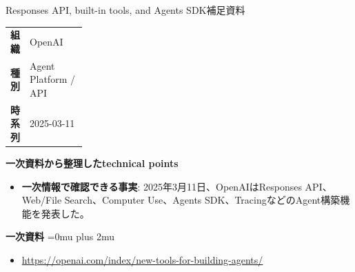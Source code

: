 \begin{technicalnote}{Responses API, built-in tools, and Agents SDK}{補足資料}
\begingroup
\begin{tabularx}{\linewidth}{@{}>{\bfseries}p{0.22\linewidth}X@{}}
組織 & OpenAI \\
種別 & Agent Platform / API \\
時系列 & 2025-03-11 \\
\end{tabularx}
\smallskip
\begin{minipage}{\linewidth}
{\bfseries 一次資料から整理したtechnical points}
\begin{itemize}[leftmargin=1.5em,itemsep=0.35em]
\item \textbf{一次情報で確認できる事実}: 2025年3月11日、OpenAIはResponses API、Web/File Search、Computer Use、Agents SDK、TracingなどのAgent構築機能を発表した。
\end{itemize}
\begin{samepage}
{\bfseries 一次資料}
\begingroup\sloppy
\Urlmuskip=0mu plus 2mu\relax
\begin{itemize}[leftmargin=1.5em,itemsep=0.25em]
\item {\scriptsize\url{https://openai.com/index/new-tools-for-building-agents/}}
\end{itemize}
\endgroup
\end{samepage}
\end{minipage}
\endgroup
\end{technicalnote}
\medskip

